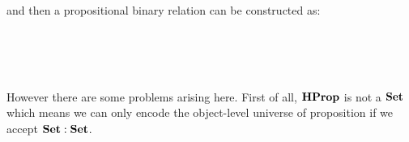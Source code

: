 \begin{code}
\\
\>[0]\<[10]%
\>[10]\AgdaSymbol{;}  \AgdaSymbol{=}     \<%
\\
\>[0]\<[10]%
\>[10]\AgdaSymbol{;}  \AgdaSymbol{=}      \AgdaInductiveConstructor{,} \<%
\\
\>[0]\<[10]%
\>[10]\AgdaSymbol{;}  \AgdaSymbol{=}  \AgdaBound{\_}   \AgdaInductiveConstructor{,}  \AgdaSymbol{\}}\<%
\\
\end{code}

and then a propositional binary relation can be constructed as:

\begin{code}
%
\\
\> \AgdaSymbol{:} \AgdaSymbol{\{} \AgdaSymbol{:} \AgdaSymbol{\}(} \AgdaSymbol{:}  \AgdaSymbol{)}   \<%
\\
\>  \AgdaSymbol{=}     \<%
\\
\end{code}

However there are some problems arising here. First of all, $\textbf{HProp}$ is not a $\operatorname{\mathbf{Set}}$ which means we can only encode the object-level universe of proposition if we accept $\operatorname{\mathbf{Set}} : \operatorname{\mathbf{Set}}$.

\begin{code}
%
\\
\> \AgdaSymbol{:} \AgdaSymbol{\{} \AgdaSymbol{:} \AgdaSymbol{\}\{} \AgdaSymbol{:}  \AgdaSymbol{\}}   \AgdaSymbol{(} \AgdaSymbol{)} \<[51]%
\>[51]\<%
\\
\>[10]\<[12]%
\>[12] \AgdaSymbol{(} \AgdaSymbol{:}   \AgdaSymbol{)}   \AgdaFunction{[}  \AgdaFunction{]fm}    \<[45]%
\>[45] \AgdaFunction{[}  \AgdaFunction{]fm}    \<%
\\
\>     \AgdaSymbol{=}  \AgdaSymbol{(} \AgdaSymbol{(}\AgdaFunction{[}  \AgdaFunction{]tm} \AgdaSymbol{)} \AgdaSymbol{)} \<%
\\
\end{code}

